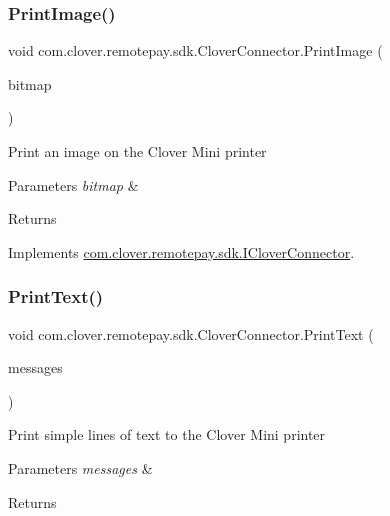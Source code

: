 \subsubsection{\texorpdfstring{Print\+Image()}{PrintImage()}}
{\footnotesize\ttfamily void com.\+clover.\+remotepay.\+sdk.\+Clover\+Connector.\+Print\+Image (\begin{DoxyParamCaption}\item[{Bitmap}]{bitmap }\end{DoxyParamCaption})}



Print an image on the Clover Mini printer 


\begin{DoxyParams}{Parameters}
{\em bitmap} & \\
\hline
\end{DoxyParams}
\begin{DoxyReturn}{Returns}

\end{DoxyReturn}


Implements \hyperlink{interfacecom_1_1clover_1_1remotepay_1_1sdk_1_1_i_clover_connector_ac716d55882598b92984159f4898bbe2a}{com.\+clover.\+remotepay.\+sdk.\+I\+Clover\+Connector}.

\mbox{\label{classcom_1_1clover_1_1remotepay_1_1sdk_1_1_clover_connector_a1601ef2709d1e2eb53fa92ff1ee46823}} 
\subsubsection{\texorpdfstring{Print\+Text()}{PrintText()}}
{\footnotesize\ttfamily void com.\+clover.\+remotepay.\+sdk.\+Clover\+Connector.\+Print\+Text (\begin{DoxyParamCaption}\item[{List$<$ string $>$}]{messages }\end{DoxyParamCaption})}



Print simple lines of text to the Clover Mini printer 


\begin{DoxyParams}{Parameters}
{\em messages} & \\
\hline
\end{DoxyParams}
\begin{DoxyReturn}{Returns}

\end{DoxyReturn}



